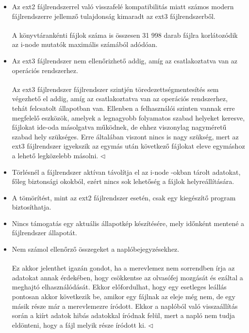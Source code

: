 \documentclass[tikz,12pt,margin=0px]{article}
\begin{document}
    \begin{itemize}[topsep=8pt,itemsep=4pt,partopsep=4pt, parsep=4pt]
        \item Az ext2 fájlrendszerrel való visszafelé kompatibilitás miatt számos modern fájlrendszerre jellemző tulajdonság kimaradt az ext3 fájlrendszerből.\\\\
        {\footnotesize \noindent {\color{blue} \faLightbulbO\ $\triangleright$ } }
        {\footnotesize
        A könyvtárankénti fájlok száma is összesen 31 998 darab fájlra korlátozódik az i-node mutatók maximális számából adódóan.}
        \item Az ext3 fájlrendszer nem ellenőrizhető addig, amíg az csatlakoztatva van az operációs rendszerhez.\\\\
        {\footnotesize \noindent {\color{blue} \faLightbulbO\ $\triangleright$ } }
        {\footnotesize
        Az ext3 fájlrendszer fájlrendszer szintjén töredezettségmentesítés sem végezhető el addig, amíg az csatlakoztatva van az operációs rendszerhez, tehát felcsatolt állapotban van. Ellenben a felhasználói szinten vannak erre megfelelő eszközök, amelyek a legnagyobb folyamatos szabad helyeket keresve, fájlokat ide-oda másolgatva működnek, de ehhez viszonylag nagyméretű szabad hely szükséges. Erre általában viszont nincs is nagy szükség, mert az ext3 fájlrendszer igyekszik az egymás után következő fájlokat eleve egymáshoz a lehető legközelebb másolni.
        $\triangleleft$ \faLightbulbO}\\
        \item Törlésnél a fájlrendszer aktívan távolítja el az i-node -okban tárolt adatokat, főleg biztonsági okokból, ezért nincs sok lehetőség a fájlok helyreállítására.
        \item A tömörítést, mint az ext2 fájlrendszer esetén, csak egy kiegészítő program biztosíthatja.
        \item Nincs támogatás egy aktuális állapotkép készítésére, mely időnként mentené a fájlrendszer állapotát.
        \item Nem számol ellenőrző összegeket a naplóbejegyzésekhez.\\\\
        {\footnotesize \noindent {\color{blue} \faLightbulbO\ $\triangleright$ } }
        {\footnotesize
        Ez akkor jelenthet igazán gondot, ha a merevlemez nem sorrendben írja az adatokat annak érdekében, hogy csökkentse az olvasófej mozgását és ezáltal a meghajtó elhasználódását. Ekkor előfordulhat, hogy egy esetleges leállás pontosan akkor következik be, amikor egy fájlnak az eleje még nem, de egy másik része már a merevlemezre íródott. Ekkor a naplóból való visszaállítás során a kiírt adatok hibás adatokkal íródnak felül, mert a napló nem tudja eldönteni, hogy a fájl melyik része íródott ki.
        $\triangleleft$ \faLightbulbO}\\
    \end{itemize}
\end{document}

